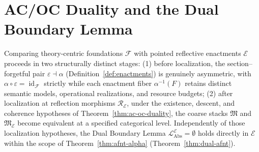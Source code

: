 \documentclass[11pt]{article}
\theoremstyle{plain}
\theoremstyle{definition}
\newcommand{\cF}{\mathcal{F}}
\newcommand{\fM}{\mathfrak{M}}
\newcommand{\LAbs}{\mathcal{L}_{\mathrm{Abs}}}
\newcommand{\cE}{\mathcal{E}}
\newcommand{\LAbsE}{\LAbs^{\cE}}
\DeclareMathOperator{\id}{id}
\begin{document}
\section{AC/OC Duality and the Dual Boundary Lemma}\label{sec:ac-oc-duality}

Comparing theory-centric foundations $\cF$ with pointed reflective enactments $\cE$ proceeds in two structurally distinct stages: (1) before localization, the section--forgetful pair $\varepsilon \dashv \alpha$ (Definition~\ref{def:enactments}) is genuinely asymmetric, with $\alpha \circ \varepsilon = \id_\cF$ strictly while each enactment fiber $\alpha^{-1}(F)$ retains distinct semantic models, operational realizations, and resource budgets; (2) after localization at reflection morphisms $\mathcal{R}_\cE$, under the existence, descent, and coherence hypotheses of Theorem~\ref{thm:ac-oc-duality}, the coarse stacks $\fM$ and $\fM_\cE$ become equivalent at a specified categorical level. Independently of those localization hypotheses, the Dual Boundary Lemma $\LAbsE = \emptyset$ holds directly in $\cE$ within the scope of Theorem~\ref{thm:afnt-alpha} (Theorem~\ref{thm:dual-afnt}).
\end{document}
